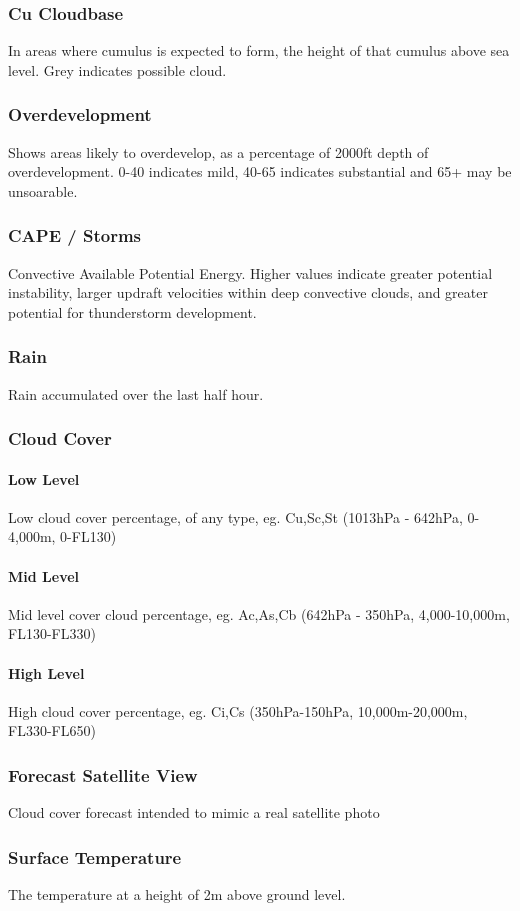 \documentclass[11pt,a4paper]{article}
\begin{document}
\subsubsection{Cu Cloudbase}
In areas where cumulus is expected to form, the height of that cumulus above sea level. Grey indicates possible cloud.
\subsubsection{Overdevelopment}
Shows areas likely to overdevelop, as a percentage of 2000ft depth of overdevelopment. 0-40 indicates mild, 40-65 indicates substantial and 65+ may be unsoarable.
\subsubsection{CAPE / Storms}
Convective Available Potential Energy. Higher values indicate greater potential instability, larger updraft velocities within deep convective clouds, and greater potential for thunderstorm development.
\subsubsection{Rain}
Rain accumulated over the last half hour.
\subsubsection{Cloud Cover}
\paragraph{Low Level} Low cloud cover percentage, of any type, eg. Cu,Sc,St (1013hPa - 642hPa, 0-4,000m, 0-FL130)
\paragraph{Mid Level} Mid level cover cloud percentage, eg. Ac,As,Cb (642hPa - 350hPa, 4,000-10,000m, FL130-FL330)
\paragraph{High Level} High cloud cover percentage, eg. Ci,Cs (350hPa-150hPa, 10,000m-20,000m, FL330-FL650)
\subsubsection{Forecast Satellite View}
Cloud cover forecast intended to mimic a real satellite photo
\subsubsection{Surface Temperature}
The temperature at a height of 2m above ground level.
\end{document}
